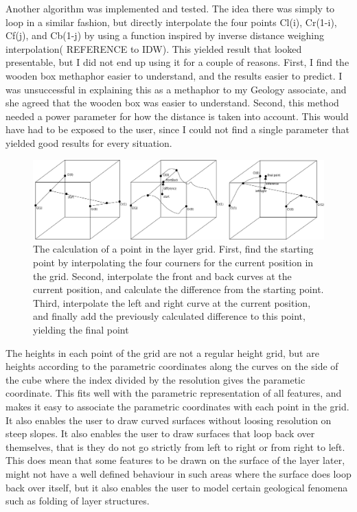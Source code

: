 \documentclass[a4paper,12pt]{report}
\begin{document}
Another algorithm was implemented and tested. The idea there was simply to loop in a similar fashion, but directly interpolate the four points Cl(i), Cr(1-i), Cf(j), and Cb(1-j) by using a function inspired by inverse distance weighing interpolation( REFERENCE to IDW). This yielded result that looked presentable, but I did not end up using it for a couple of reasons. First, I find the wooden box methaphor easier to understand, and the results easier to predict. I was unsuccessful in explaining this as a methaphor to my Geology associate, and she agreed that the wooden box was easier to understand. Second, this method needed a power parameter for how the distance is taken into account. This would have had to be exposed to the user, since I could not find a single parameter that yielded good results for every situation.

\begin{figure}
 \label{fig:layerCreation}
 \includegraphics[width=\linewidth]{thesis/layerCreation.pdf}
 \caption{The calculation of a point in the layer grid. First, find the starting point by interpolating the four courners for the current position in the grid. Second, interpolate the front and back curves at the current position, and calculate the difference from the starting point. Third, interpolate the left and right curve at the current position, and finally add the previously calculated difference to this point, yielding the final point}
\end{figure}



The heights in each point of the grid are not a regular height grid, but are heights according to the parametric coordinates along the curves on the side of the cube where the index divided by the resolution gives the parametic coordinate. This fits well with the parametric representation of all features, and makes it easy to associate the parametric coordinates with each point in the grid. It also enables the user to draw curved surfaces without loosing resolution on steep slopes. It also enables the user to draw surfaces that loop back over themselves, that is they do not go strictly from left to right or from right to left. This does mean that some features to be drawn on the surface of the layer later, might not have a well defined behaviour in such areas where the surface does loop back over itself, but it also enables the user to model certain geological fenomena such as folding of layer structures.
\end{document}
